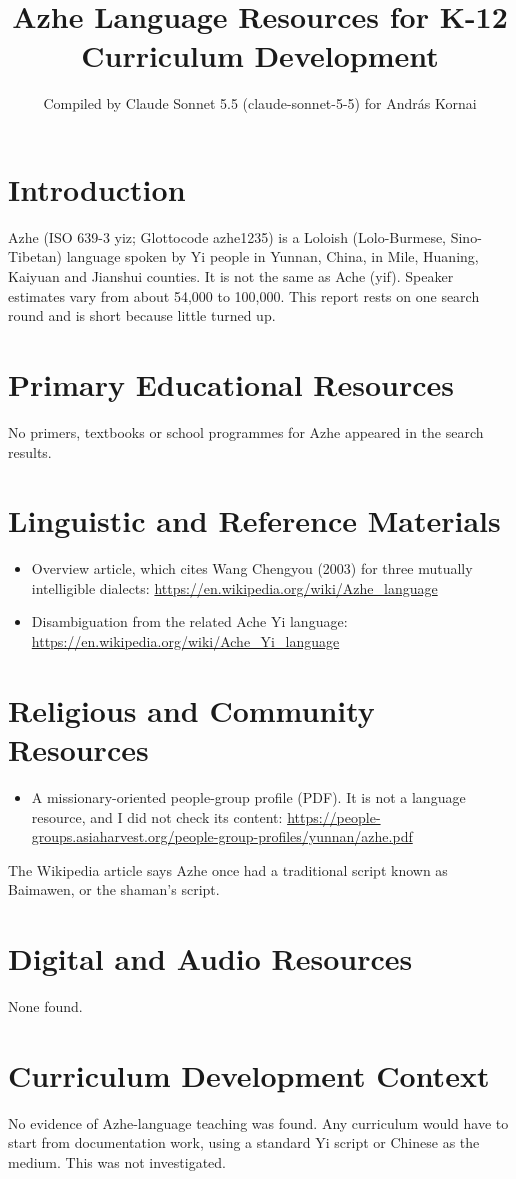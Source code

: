 \documentclass[12pt]{article}
\title{Azhe Language Resources for K-12 Curriculum Development}
\author{Compiled by Claude Sonnet 5.5 (claude-sonnet-5-5) for Andr\'as Kornai}
\date{}
\begin{document}
\maketitle

\section{Introduction}
Azhe (ISO 639-3 yiz; Glottocode azhe1235) is a Loloish (Lolo-Burmese, Sino-Tibetan) language spoken by Yi people in Yunnan, China, in Mile, Huaning, Kaiyuan and Jianshui counties. It is not the same as Ache (yif). Speaker estimates vary from about 54,000 to 100,000. This report rests on one search round and is short because little turned up.

\section{Primary Educational Resources}
No primers, textbooks or school programmes for Azhe appeared in the search results.

\section{Linguistic and Reference Materials}
\begin{itemize}
\item Overview article, which cites Wang Chengyou (2003) for three mutually intelligible dialects: \url{https://en.wikipedia.org/wiki/Azhe_language}
\item Disambiguation from the related Ache Yi language: \url{https://en.wikipedia.org/wiki/Ache_Yi_language}
\end{itemize}

\section{Religious and Community Resources}
\begin{itemize}
\item A missionary-oriented people-group profile (PDF). It is not a language resource, and I did not check its content: \url{https://people-groups.asiaharvest.org/people-group-profiles/yunnan/azhe.pdf}
\end{itemize}
The Wikipedia article says Azhe once had a traditional script known as Baimawen, or the shaman's script.

\section{Digital and Audio Resources}
None found.

\section{Curriculum Development Context}
No evidence of Azhe-language teaching was found. Any curriculum would have to start from documentation work, using a standard Yi script or Chinese as the medium. This was not investigated.
\end{document}
